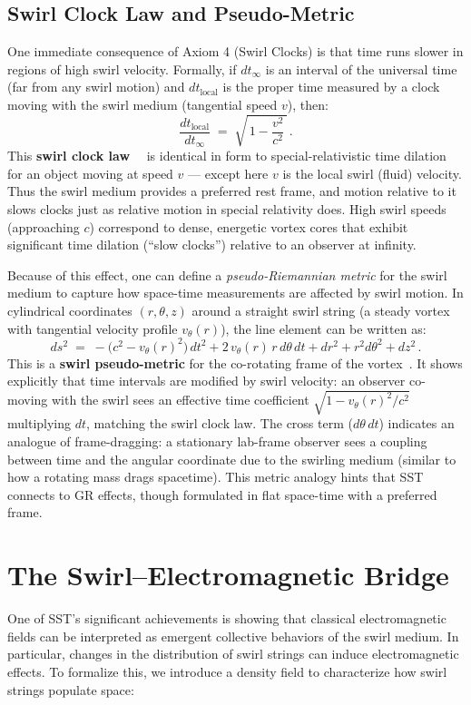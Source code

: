 \documentclass[aps,onecolumn,10pt,nofootinbib]{revtex4}
\begin{document}
	\subsection*{Swirl Clock Law and Pseudo-Metric}
	One immediate consequence of Axiom 4 (Swirl Clocks) is that time runs slower in regions of high swirl velocity. Formally, if $dt_{\infty}$ is an interval of the universal time (far from any swirl motion) and $dt_{\text{local}}$ is the proper time measured by a clock moving with the swirl medium (tangential speed $v$), then:
	\[
		\frac{dt_{\text{local}}}{dt_{\infty}} \;=\; \sqrt{\,1 - \frac{v^2}{c^2}\,}\,.
	\]
	This \textbf{swirl clock law}~\cite{index53}~\cite{index54} is identical in form to special-relativistic time dilation for an object moving at speed $v$ — except here $v$ is the local swirl (fluid) velocity. Thus the swirl medium provides a preferred rest frame, and motion relative to it slows clocks just as relative motion in special relativity does. High swirl speeds (approaching $c$) correspond to dense, energetic vortex cores that exhibit significant time dilation (“slow clocks”) relative to an observer at infinity.

	Because of this effect, one can define a \emph{pseudo-Riemannian metric} for the swirl medium to capture how space-time measurements are affected by swirl motion. In cylindrical coordinates $(r,\theta,z)$ around a straight swirl string (a steady vortex with tangential velocity profile $v_{\theta}(r)$), the line element can be written as:
	\[
		ds^2 \;=\; -\big(c^2 - v_{\theta}(r)^2\big)\,dt^2 + 2\,v_{\theta}(r)\,r\,d\theta\,dt + dr^2 + r^2 d\theta^2 + dz^2\,.
	\]
	This is a \textbf{swirl pseudo-metric} for the co-rotating frame of the vortex~\cite{index55}. It shows explicitly that time intervals are modified by swirl velocity: an observer co-moving with the swirl sees an effective time coefficient $\sqrt{1 - v_{\theta}(r)^2/c^2}$ multiplying $dt$, matching the swirl clock law. The cross term ($d\theta\,dt$) indicates an analogue of frame-dragging: a stationary lab-frame observer sees a coupling between time and the angular coordinate due to the swirling medium (similar to how a rotating mass drags spacetime). This metric analogy hints that SST connects to GR effects, though formulated in flat space-time with a preferred frame.

	\section{The Swirl–Electromagnetic Bridge}
	One of SST’s significant achievements is showing that classical electromagnetic fields can be interpreted as emergent collective behaviors of the swirl medium. In particular, changes in the distribution of swirl strings can induce electromagnetic effects. To formalize this, we introduce a density field to characterize how swirl strings populate space:
\end{document}
